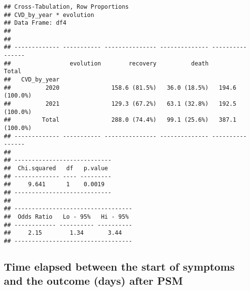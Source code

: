 \documentclass[
]{article}
\newenvironment{Shaded}{\begin{snugshade}}{\end{snugshade}}
\newcommand{\AttributeTok}[1]{\textcolor[rgb]{0.13,0.29,0.53}{#1}}
\newcommand{\CommentTok}[1]{\textcolor[rgb]{0.56,0.35,0.01}{\textit{#1}}}
\newcommand{\FunctionTok}[1]{\textcolor[rgb]{0.13,0.29,0.53}{\textbf{#1}}}
\newcommand{\NormalTok}[1]{#1}
\newcommand{\OtherTok}[1]{\textcolor[rgb]{0.56,0.35,0.01}{#1}}
\newcommand{\SpecialCharTok}[1]{\textcolor[rgb]{0.81,0.36,0.00}{\textbf{#1}}}
\newcommand{\StringTok}[1]{\textcolor[rgb]{0.31,0.60,0.02}{#1}}
\begin{document}
\begin{verbatim}
## Cross-Tabulation, Row Proportions  
## CVD_by_year * evolution  
## Data Frame: df4  
## 
## 
## ------------- ----------- --------------- -------------- ----------------
##                 evolution        recovery          death            Total
##   CVD_by_year                                                            
##          2020               158.6 (81.5%)   36.0 (18.5%)   194.6 (100.0%)
##          2021               129.3 (67.2%)   63.1 (32.8%)   192.5 (100.0%)
##         Total               288.0 (74.4%)   99.1 (25.6%)   387.1 (100.0%)
## ------------- ----------- --------------- -------------- ----------------
## 
## ----------------------------
##  Chi.squared   df   p.value 
## ------------- ---- ---------
##     9.641      1    0.0019  
## ----------------------------
## 
## ----------------------------------
##  Odds Ratio   Lo - 95%   Hi - 95% 
## ------------ ---------- ----------
##     2.15        1.34       3.44   
## ----------------------------------
\end{verbatim}

\hypertarget{time-elapsed-between-the-start-of-symptoms-and-the-outcome-days-after-psm}{%
\subsection{Time elapsed between the start of symptoms and the outcome
(days) after
PSM}\label{time-elapsed-between-the-start-of-symptoms-and-the-outcome-days-after-psm}}

\begin{Shaded}
\end{Shaded}
\end{document}
